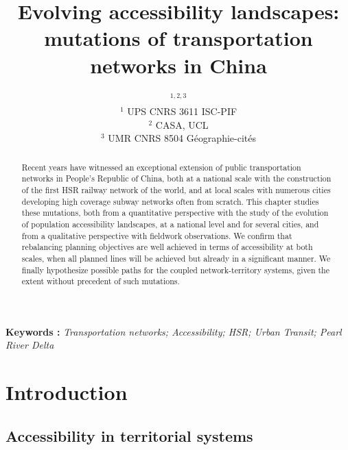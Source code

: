 


\title{Evolving accessibility landscapes: mutations of transportation networks in China}
\author{$^{1,2,3}$\\
$^1$ UPS CNRS 3611 ISC-PIF\\
$^2$ CASA, UCL\\
$^3$ UMR CNRS 8504 G{\'e}ographie-cit{\'e}s
}
\date{}


\maketitle

\justify


\begin{abstract}
Recent years have witnessed an exceptional extension of public transportation networks in People's Republic of China, both at a national scale with the construction of the first HSR railway network of the world, and at local scales with numerous cities developing high coverage subway networks often from scratch. This chapter studies these mutations, both from a quantitative perspective with the study of the evolution of population accessibility landscapes, at a national level and for several cities, and from a qualitative perspective with fieldwork observations. We confirm that rebalancing planning objectives are well achieved in terms of accessibility at both scales, when all planned lines will be achieved but already in a significant manner. We finally hypothesize possible paths for the coupled network-territory systems, given the extent without precedent of such mutations.
\end{abstract}

\textbf{Keywords : }\textit{Transportation networks; Accessibility; HSR; Urban Transit; Pearl River Delta}



\section{Introduction}

\subsection{Accessibility in territorial systems}

